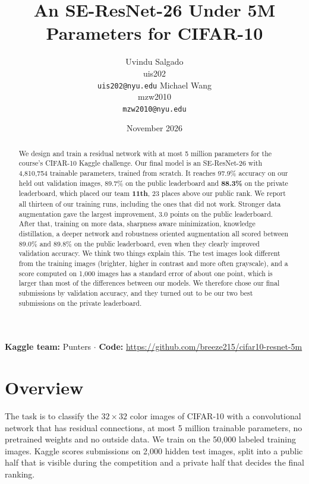 \documentclass{article}
\date{November 2026}
\title{An SE-ResNet-26 Under 5M Parameters for CIFAR-10}
\author{
  Uvindu Salgado \\ uis202 \\ \texttt{uis202@nyu.edu}
  \And
  Michael Wang \\ mzw2010 \\ \texttt{mzw2010@nyu.edu}
}
\begin{document}
\maketitle

\begin{center}
\textbf{Kaggle team:} Punters \quad$\cdot$\quad
\textbf{Code:} \url{https://github.com/breeze215/cifar10-resnet-5m}
\end{center}

\begin{abstract}
We design and train a residual network with at most 5 million parameters for the course's CIFAR-10 Kaggle challenge.
Our final model is an SE-ResNet-26 with 4,810,754 trainable parameters, trained from scratch. It reaches 97.9\%
accuracy on our held out validation images, 89.7\% on the public leaderboard and \textbf{88.3\%} on the private
leaderboard, which placed our team \textbf{11th}, 23 places above our public rank. We report all thirteen of our
training runs, including the ones that did not work. Stronger data augmentation gave the largest improvement, 3.0
points on the public leaderboard. After that, training on more data, sharpness aware minimization, knowledge
distillation, a deeper network and robustness oriented augmentation all scored between 89.0\% and 89.8\% on the public
leaderboard, even when they clearly improved validation accuracy. We think two things explain this. The test images
look different from the training images (brighter, higher in contrast and more often grayscale), and a score computed
on 1,000 images has a standard error of about one point, which is larger than most of the differences between our
models. We therefore chose our final submissions by validation accuracy, and they turned out to be our two best
submissions on the private leaderboard.
\end{abstract}

\section{Overview}

The task is to classify the $32\times32$ color images of CIFAR-10 \citep{krizhevsky2009cifar} with a convolutional
network that has residual connections, at most 5 million trainable parameters, no pretrained weights and no outside
data. We train on the 50,000 labeled training images. Kaggle scores submissions on 2,000 hidden test images, split into
a public half that is visible during the competition and a private half that decides the final ranking.
\end{document}
